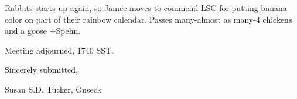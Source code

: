 \documentclass[12pt]{article}
\begin{document}
Rabbits starts up again, so Janice moves to commend LSC for putting banana color on part of their rainbow calendar. Passes many-almost as many-4 chickens and a goose +Spehn.

\vspace{12pt}

\noindent
Meeting adjourned, 1740 SST.

\vspace{18pt}

\centerline{Sincerely submitted,}
\centerline{Susan S.D. Tucker, Onseck}
\end{document}

